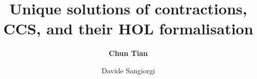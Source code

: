 \documentclass{beamer}
\begin{document}
\title[Unique solutions of contractions]{Unique solutions of contractions, CCS, and their HOL formalisation}

\author[C. Tian and D. Sangiorgi]{\textbf{Chun Tian} \and Davide Sangiorgi}



\begin{frame}
\titlepage
\end{frame}


\end{document}

